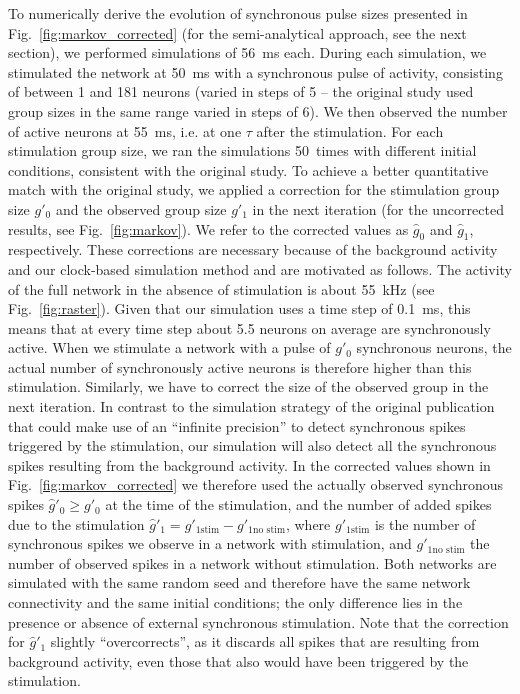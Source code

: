 \documentclass[10pt,a4paper,onecolumn]{article}
\begin{document}
To numerically derive the evolution of synchronous pulse sizes presented in Fig.~\ref{fig:markov_corrected} (for the semi-analytical approach, see the next section), we performed simulations of \SI{56}{\milli\second} each. During each simulation, we stimulated the network at \SI{50}{\milli\second} with a synchronous pulse of activity, consisting of between 1 and 181 neurons (varied in steps of 5 -- the original study used group sizes in the same range varied in steps of 6). We then observed the number of active neurons at \SI{55}{\milli\second}, i.e. at one $\tau$ after the stimulation. For each stimulation group size, we ran the simulations 50~times with different initial conditions, consistent with the original study. To achieve a better quantitative match with the original study, we applied a correction for the stimulation group size $g'_0$ and the observed group size $g'_1$ in the next iteration (for the uncorrected results, see Fig.~\ref{fig:markov}). We refer to the corrected values as $\hat{g}_0$ and $\hat{g}_1$, respectively. These corrections are necessary because of the background activity and our clock-based simulation method and are motivated as follows.  The activity of the full network in the absence of stimulation is about \SI{55}{\kilo\hertz} (see Fig.~\ref{fig:raster}). Given that our simulation uses a time step of \SI{0.1}{\milli\second}, this means that at every time step about 5.5 neurons on average are synchronously active. When we stimulate a network with a pulse of $g'_0$ synchronous neurons, the actual number of synchronously active neurons is therefore higher than this stimulation. Similarly, we have to correct the size of the observed group in the next iteration. In contrast to the simulation strategy of the original publication that could make use of an ``infinite precision'' to detect synchronous spikes triggered by the stimulation, our simulation will also detect all the synchronous spikes resulting from the background activity. In the corrected values shown in Fig.~\ref{fig:markov_corrected} we therefore used the actually observed synchronous spikes $\hat{g}'_0 \geq g'_0$ at the time of the stimulation, and the number of added spikes due to the stimulation $\hat{g}'_1 = g'_{1 \text{stim}} - g'_{1 \text{no stim}}$, where $g'_{1 \text{stim}}$ is the number of synchronous spikes we observe in a network with stimulation, and $g'_{1 \text{no stim}}$ the number of observed spikes in a network without stimulation. Both networks are simulated with the same random seed and therefore have the same network connectivity and the same initial conditions; the only difference lies in the presence or absence of external synchronous stimulation. Note that the correction for $\hat{g}'_1$ slightly ``overcorrects'', as it discards all spikes that are resulting from background activity, even those that also would have been triggered by the stimulation.
\end{document}
